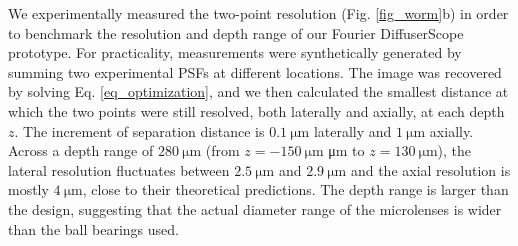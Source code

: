 \documentclass{osa-article}
\begin{document}
We experimentally measured the two-point resolution  (Fig. \ref{fig_worm}b) in order to benchmark the resolution and depth range of our Fourier DiffuserScope prototype. For practicality, measurements were synthetically generated by summing two experimental PSFs at different locations. The image was recovered by solving Eq. \ref{eq_optimization}, and we then calculated the smallest distance at which the two points were still resolved, both laterally and axially, at each depth $z$. The increment of separation distance is $\SI{0.1}{\micro\meter}$ laterally and $\SI{1}{\micro\meter}$ axially. Across a depth range of $\SI{280}{\micro\meter}$  (from $z= \SI{-150}{\micro\meter}$ μm to $z = \SI{130}{\micro\meter}$), the lateral resolution fluctuates between $\SI{2.5}{\micro\meter}$ and $\SI{2.9}{\micro\meter}$ and the axial resolution is mostly $\SI{4}{\micro\meter}$, close to their theoretical predictions. The depth range is larger than the design, suggesting that the actual diameter range of the microlenses is wider than the ball bearings used.
\end{document}
